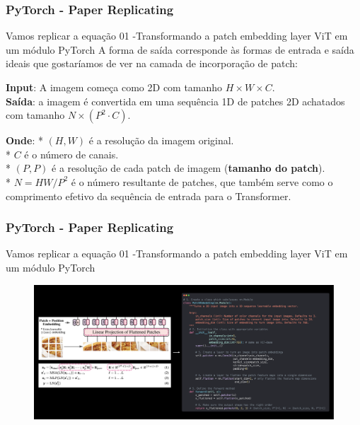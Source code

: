 \documentclass{beamer}
\begin{document}
\begin{frame}
	\frametitle{PyTorch - Paper Replicating}
	\begin{block}{Vamos replicar a equação 01 -Transformando a patch embedding layer ViT em um módulo PyTorch}
		A forma de saída corresponde às formas de entrada e saída ideais que gostaríamos de ver na camada de incorporação de patch:
		
		\textbf{Input}: A imagem começa como 2D com tamanho ${H \times W \times C}$. \\
		\textbf{Saída}: a imagem é convertida em uma sequência 1D de patches 2D achatados com tamanho ${N \times\left(P^{2} \cdot C\right)}$.
		
		\textbf{Onde}:
		* $(H, W)$ é a resolução da imagem original. \\
		* $C$ é o número de canais. \\
		* $(P, P)$ é a resolução de cada patch de imagem (\textbf{tamanho do patch}). \\
		* $N=H W / P^{2}$ é o número resultante de patches, que também serve como o comprimento efetivo da sequência de entrada para o Transformer. 

	\end{block}
\end{frame}
\begin{frame}
	\frametitle{PyTorch - Paper Replicating}
	\begin{block}{Vamos replicar a equação 01 -Transformando a patch embedding layer ViT em um módulo PyTorch}
	\begin{figure}
		\centering
		\includegraphics[width=1\linewidth]{figures/vit_patch_class_emb}
	\end{figure}

		
	\end{block}
\end{frame}
\end{document}
